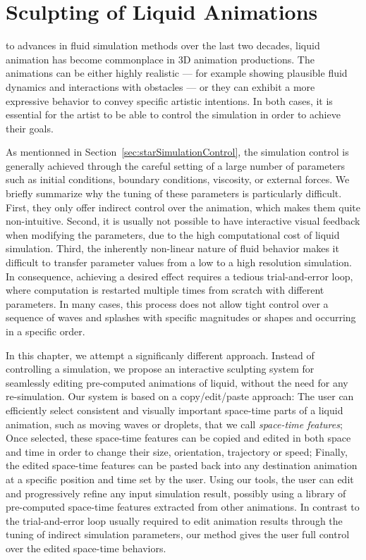 \chapter[Sculpting of Liquid Animations]{Sculpting of Liquid Animations}
\label{chap:fluidsculpting}
 to advances in fluid simulation methods over the last two decades, liquid animation has become commonplace in 3D animation productions. 
The animations can be either highly realistic --- for example showing plausible fluid dynamics and interactions with obstacles --- or they can exhibit a more expressive behavior to convey specific artistic intentions. In both cases, it is essential for the artist to be able to control the simulation in order to achieve their goals.

As mentionned in Section~\ref{sec:starSimulationControl}, the simulation control is generally achieved through the careful setting of a large number of parameters such as initial conditions, boundary conditions, viscosity, or external forces. 
We briefly summarize why the tuning of these parameters is particularly difficult.
First, they only offer indirect control over the animation, which makes them quite non-intuitive. 
Second, it is usually not possible to have interactive visual feedback when modifying the parameters, due to the high computational cost of 
liquid simulation.
Third, the inherently non-linear nature of fluid behavior makes it difficult to transfer parameter values from a low to a high resolution simulation. 
In consequence, achieving a desired effect requires a tedious trial-and-error loop, where computation is restarted multiple times from scratch with different parameters. 
In many cases, this process does not allow tight control over a sequence of waves and splashes with specific magnitudes or shapes and occurring in a specific order. 

In this chapter, we attempt a significanly different approach.
Instead of controlling a simulation, we propose an interactive sculpting system for seamlessly editing pre-computed animations of liquid, without the need for any re-simulation. 
Our system is based on a copy/edit/paste approach:
The user can efficiently select consistent and visually important space-time parts of a liquid animation, such as moving waves or droplets, that we call \emph{space-time features};
Once selected, these space-time features can be copied and edited in both space and time in order to change their size, orientation, trajectory or speed;
Finally, the edited space-time features can be pasted back into any destination animation at a specific position and time set by the user.
Using our tools, the user can edit and progressively refine any input simulation result, possibly using a library of pre-computed space-time features extracted from other animations. 
In contrast to the trial-and-error loop usually required to edit animation results through the tuning of indirect simulation parameters, our method gives the user full control over the edited space-time behaviors. 

